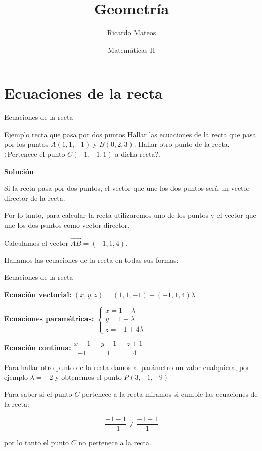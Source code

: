 \documentclass[8pt]{beamer}
\title{Geometría}
\author{Ricardo Mateos}
\institute[UHEI-IVED]{Departamento de Matemáticas \\ UHEI - IVED}
\date{Matemáticas II}
\renewcommand{\vector}[1]{\overrightarrow{#1}}
\begin{document}
\begin{frame}
\maketitle
\end{frame}

\begin{frame}
\tableofcontents
\end{frame}

\section{Ecuaciones de la recta}

\begin{frame}[t]{Ecuaciones de la recta}
\begin{exampleblock}{Ejemplo recta que pasa por dos puntos}
Hallar las ecuaciones de la recta que pasa por los puntos $A(1,1,-1)$ y $B(0,2,3)$. Hallar otro punto de la recta. ¿Pertenece el punto $C(-1,-1,1)$ a dicha recta?. 
\end{exampleblock}



\textbf{Solución}

Si la recta pasa por dos puntos, el vector que une los dos puntos será un vector director de la recta. 

Por lo tanto, para calcular la recta utilizaremos uno de los puntos y el vector que une los dos puntos como vector director.

Calculamos el vector $\vector{AB}=(-1,1,4)$.

Hallamos las ecuaciones de la recta en todas sus formas:
\end{frame}

\begin{frame}{Ecuaciones de la recta}

\textbf{\color{titleColor!70}Ecuación vectorial:}  $(x,y,z)=(1,1,-1)+(-1,1,4)\lambda$

\textbf{\color{titleColor!70}Ecuaciones paramétricas:} $\begin{cases} x=1-\lambda \\ y=1+\lambda \\ z= -1+4 \lambda\end{cases}$

\textbf{\color{titleColor!70}Ecuación continua:} $\dfrac{x-1}{-1}=\dfrac{y-1}{1}=\dfrac{z+1}{4}$ 

Para hallar otro punto de la recta damos al parámetro un valor cualquiera, por ejemplo $\lambda=-2$ y obtenemos el punto $P(3,-1,-9)$

Para saber si el punto $C$ pertenece a la recta miramos si cumple las ecuaciones de la recta:

\[ \dfrac{-1-1}{-1} \neq \dfrac{-1-1}{1} \]

por lo tanto el punto $C $ no pertenece a la recta.
\end{frame}
\end{document}
